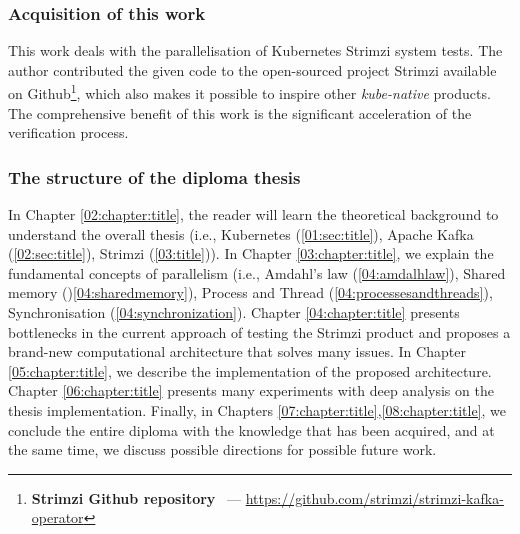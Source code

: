 \subsubsection*{Acquisition of this work}

This work deals with the parallelisation of Kubernetes Strimzi system tests.
The author contributed the given code to the open-sourced project Strimzi available on Github\footnote{\textbf{Strimzi Github repository} \ ---
\url{https://github.com/strimzi/strimzi-kafka-operator}}, which also makes it possible to inspire other \emph{kube-native} products.
The comprehensive benefit of this work is the significant acceleration of the verification process.

\subsubsection*{The structure of the diploma thesis}

In Chapter \ref{02:chapter:title}, the reader will learn the theoretical background to understand the overall thesis (i.e., Kubernetes (\ref{01:sec:title}), Apache Kafka (\ref{02:sec:title}), Strimzi (\ref{03:title})).
In Chapter \ref{03:chapter:title}, we explain the fundamental concepts of parallelism (i.e., Amdahl's law (\ref{04:amdalhlaw}), Shared memory ()\ref{04:sharedmemory}), Process and Thread (\ref{04:processesandthreads}), Synchronisation (\ref{04:synchronization}).
Chapter \ref{04:chapter:title} presents bottlenecks in the current approach of testing the Strimzi product and proposes a brand-new computational architecture that solves many issues.
In Chapter \ref{05:chapter:title}, we describe the implementation of the proposed architecture.
Chapter \ref{06:chapter:title} presents many experiments with deep analysis on the thesis implementation.
Finally, in Chapters \ref{07:chapter:title},\ref{08:chapter:title}, we conclude the entire diploma with the knowledge that has been acquired, and at the same time, we discuss possible directions for possible future work.